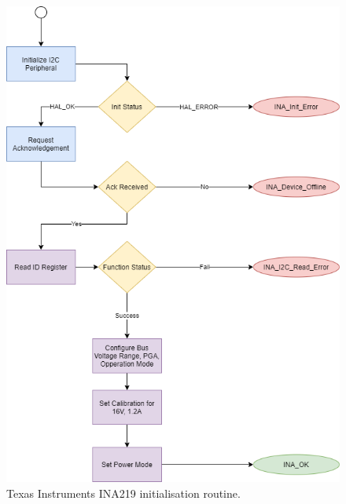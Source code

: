\begin{figure}[H]
	\centering
	\includegraphics[scale=0.3]{INA219 Init routine.png}
	\caption{Texas Instruments INA219 initialisation routine.}
	\label{fig:Init_diagram_ina}
\end{figure}

